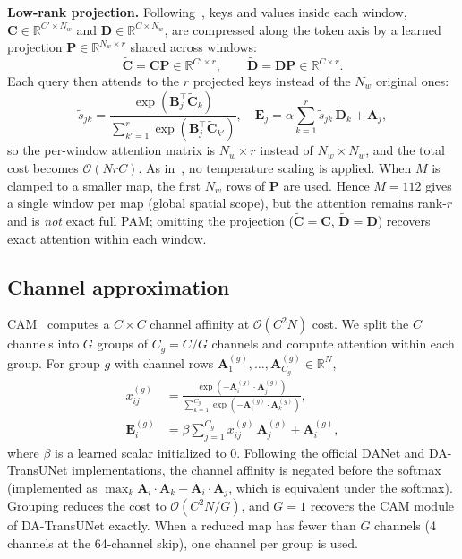 \textbf{Low-rank projection.} Following~\cite{wang2020linformer}, keys and values inside each window, $\mathbf{C} \in \mathbb{R}^{C' \times N_w}$ and $\mathbf{D} \in \mathbb{R}^{C \times N_w}$, are compressed along the token axis by a learned projection $\mathbf{P} \in \mathbb{R}^{N_w \times r}$ shared across windows:
\begin{equation}
  \tilde{\mathbf{C}} = \mathbf{C}\mathbf{P} \in \mathbb{R}^{C' \times r}, \qquad \tilde{\mathbf{D}} = \mathbf{D}\mathbf{P} \in \mathbb{R}^{C \times r}.
  \label{eq:lowrank}
\end{equation}
Each query then attends to the $r$ projected keys instead of the $N_w$ original ones:
\begin{equation}
  \tilde{s}_{jk} = \frac{\exp(\mathbf{B}_j^{\top}\tilde{\mathbf{C}}_k)}{\sum_{k'=1}^{r}\exp(\mathbf{B}_j^{\top}\tilde{\mathbf{C}}_{k'})}, \quad
  \mathbf{E}_j = \alpha \sum_{k=1}^{r} \tilde{s}_{jk}\,\tilde{\mathbf{D}}_k + \mathbf{A}_j,
  \label{eq:pam_lr}
\end{equation}
so the per-window attention matrix is $N_w{\times}r$ instead of $N_w{\times}N_w$, and the total cost becomes $\mathcal{O}(NrC)$. As in~\cite{fu2019dual}, no temperature scaling is applied. When $M$ is clamped to a smaller map, the first $N_w$ rows of $\mathbf{P}$ are used. Hence $M{=}112$ gives a single window per map (global spatial scope), but the attention remains rank-$r$ and is \emph{not} exact full PAM; omitting the projection ($\tilde{\mathbf{C}}{=}\mathbf{C}$, $\tilde{\mathbf{D}}{=}\mathbf{D}$) recovers exact attention within each window.

\subsection{Channel approximation}

CAM~\cite{fu2019dual} computes a $C{\times}C$ channel affinity at $\mathcal{O}(C^2N)$ cost. We split the $C$ channels into $G$ groups of $C_g = C/G$ channels and compute attention within each group. For group $g$ with channel rows $\mathbf{A}^{(g)}_1,\dots,\mathbf{A}^{(g)}_{C_g} \in \mathbb{R}^{N}$,
\begin{equation}
\begin{aligned}
  x^{(g)}_{ij} &= \frac{\exp(-\mathbf{A}^{(g)}_i \cdot \mathbf{A}^{(g)}_j)}{\sum_{k=1}^{C_g}\exp(-\mathbf{A}^{(g)}_i \cdot \mathbf{A}^{(g)}_k)}, \\
  \mathbf{E}^{(g)}_i &= \beta \sum_{j=1}^{C_g} x^{(g)}_{ij}\,\mathbf{A}^{(g)}_j + \mathbf{A}^{(g)}_i,
\end{aligned}
  \label{eq:groupedcam}
\end{equation}
where $\beta$ is a learned scalar initialized to 0. Following the official DANet and DA-TransUNet implementations, the channel affinity is negated before the softmax (implemented as $\max_k \mathbf{A}_i\cdot\mathbf{A}_k - \mathbf{A}_i\cdot\mathbf{A}_j$, which is equivalent under the softmax). Grouping reduces the cost to $\mathcal{O}(C^2N/G)$, and $G{=}1$ recovers the CAM module of DA-TransUNet exactly. When a reduced map has fewer than $G$ channels (4 channels at the 64-channel skip), one channel per group is used.

